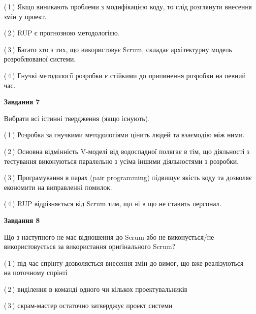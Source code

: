 \documentclass[10pt, ukrainian]{article}
\begin{document}
{\begin {large}
(\,1\,) Якщо виникають проблеми з модифікацією коду, то слід розглянути внесення змін у проект. %



(\,2\,) RUP є прогнозною методологією. %



(\,3\,) Багато хто з тих, що використовує Scrum, складає архітектурну модель розроблюваної системи. %



(\,4\,) Гнучкі методології розробки є стійкими до припинення розробки на певний час. %


{\begin {center}\textbf{Завдання 7}\end {center}}\par
Вибрати всі істинні твердження (якщо існують).\par
\vspace{2mm}



(\,1\,) Розробка за гнучкими методологіями цінить людей та взаємодію між ними. %



(\,2\,) Основна відмінність V-моделі від водоспадної полягає в тім, що діяльності з тестування виконуються паралельно з усіма іншими діяльностями з розробки. %



(\,3\,) Програмування в парах (pair programming) підвищує якість коду та дозволяє економити на виправленні помилок. %



(\,4\,) RUP відрізняється від Scrum тим, що ні в що не ставить персонал.%


{\begin {center}\textbf{Завдання 8}\end {center}}\par
Що з наступного не має відношення до Scrum або не виконується/не використовується за використання оригінального Scrum?\par
\vspace{2mm}



(\,1\,) під час спрінту дозволяється внесення змін до вимог, що вже реалізуються на поточному спрінті%



(\,2\,) виділення в команді одного чи кількох проектувальників%



(\,3\,) скрам-мастер остаточно затверджує проект системи%




\end{large}}
\end{document}

